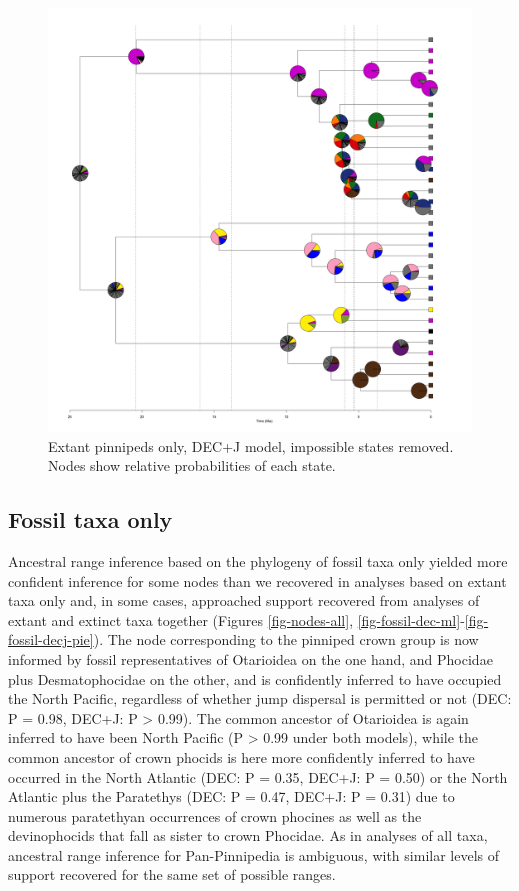 \documentclass[a4paper, 12pt]{article}
\begin{document}
\begin{figure}[H]
\centering
  \includegraphics[width = \linewidth]{figures/extant-pinnipeds-DECj-impossible-pies.png}
  \caption{Extant pinnipeds only, DEC+J model, impossible states removed. Nodes show relative probabilities of each state.}
  \label{fig-extant-decj-pie}
\end{figure} 
 
\subsection{Fossil taxa only}

Ancestral range inference based on the phylogeny of fossil taxa only yielded more confident inference for some nodes than we recovered in analyses based on extant taxa only and, in some cases, approached support recovered from analyses of extant and extinct taxa together (Figures \ref{fig-nodes-all}, \ref{fig-fossil-dec-ml}-\ref{fig-fossil-decj-pie}). The node corresponding to the pinniped crown group is now informed by fossil representatives of Otarioidea on the one hand, and Phocidae plus Desmatophocidae on the other, and is confidently inferred to have occupied the North Pacific, regardless of whether jump dispersal is permitted or not (DEC: P = 0.98, DEC+J: P > 0.99). The common ancestor of Otarioidea is again inferred to have been North Pacific (P > 0.99 under both models), while the common ancestor of crown phocids is here more confidently inferred to have occurred in the North Atlantic (DEC: P = 0.35, DEC+J: P = 0.50) or the North Atlantic plus the Paratethys (DEC: P = 0.47, DEC+J: P = 0.31) due to numerous paratethyan occurrences of crown phocines as well as the devinophocids that fall as sister to crown Phocidae. As in analyses of all taxa, ancestral range inference for Pan-Pinnipedia is ambiguous, with similar levels of support recovered for the same set of possible ranges.   
\end{document}
